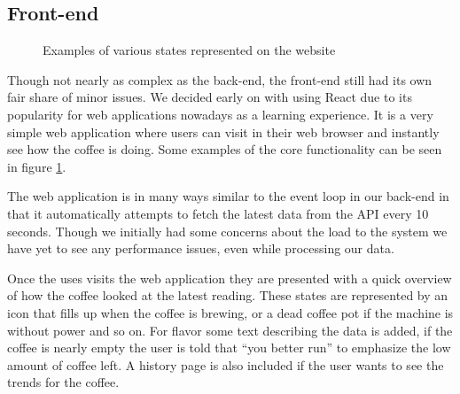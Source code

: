 \documentclass[12pt,a4paper,oneside,article]{memoir}
\numberwithin{equation}{chapter}
\begin{document}
\subsection{Front-end}\label{sec:front-end}
\begin{figure}[ht]
  \centerfloat{}
  \caption{Examples of various states represented on the website}\label{fig:website}
\end{figure}
Though not nearly as complex as the back-end, the front-end still had its own
fair share of minor issues. We decided early on with using React due to its
popularity for web applications nowadays as a learning experience. It is a very
simple web application where users can visit in their web browser and instantly
see how the coffee is doing. Some examples of the core functionality can be seen
in figure \ref{fig:website}.

The web application is in many ways similar to the event loop in our back-end in
that it automatically attempts to fetch the latest data from the API every 10
seconds. Though we initially had some concerns about the load to the system we
have yet to see any performance issues, even while processing our data.

Once the uses visits the web application they are presented with a quick
overview of how the coffee looked at the latest reading. These states are
represented by an icon that fills up when the coffee is brewing, or a dead
coffee pot if the machine is without power and so on. For flavor some text
describing the data is added, if the coffee is nearly empty the user is told
that ``you better run'' to emphasize the low amount of coffee left. A history
page is also included if the user wants to see the trends for the coffee.
\end{document}
